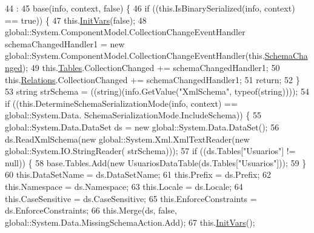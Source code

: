 \begin{DoxyCode}
44                                                                                                            
                                                : 
45                 base(info, context, \textcolor{keyword}{false}) \{
46             \textcolor{keywordflow}{if} ((this.IsBinarySerialized(info, context) == \textcolor{keyword}{true})) \{
47                 this.\hyperlink{class_proyecto___integrador__3_1_1ds_usuarios_ab120e453e46f20e82cdb1440541a8bfc}{InitVars}(\textcolor{keyword}{false});
48                 global::System.ComponentModel.CollectionChangeEventHandler schemaChangedHandler1 = \textcolor{keyword}{new} 
      global::System.ComponentModel.CollectionChangeEventHandler(this.\hyperlink{class_proyecto___integrador__3_1_1ds_usuarios_a48c9727d0752dcca6fa0cc10e6937861}{SchemaChanged});
49                 this.\hyperlink{class_proyecto___integrador__3_1_1ds_usuarios_a5a3e80b30906b3389a7282cdf5dd621c}{Tables}.CollectionChanged += schemaChangedHandler1;
50                 this.\hyperlink{class_proyecto___integrador__3_1_1ds_usuarios_ac1a722fbe5919c3d98ef3cc923978cec}{Relations}.CollectionChanged += schemaChangedHandler1;
51                 \textcolor{keywordflow}{return};
52             \}
53             \textcolor{keywordtype}{string} strSchema = ((string)(info.GetValue(\textcolor{stringliteral}{"XmlSchema"}, typeof(\textcolor{keywordtype}{string}))));
54             \textcolor{keywordflow}{if} ((this.DetermineSchemaSerializationMode(info, context) == global::System.Data.
      SchemaSerializationMode.IncludeSchema)) \{
55                 global::System.Data.DataSet ds = \textcolor{keyword}{new} global::System.Data.DataSet();
56                 ds.ReadXmlSchema(\textcolor{keyword}{new} global::System.Xml.XmlTextReader(\textcolor{keyword}{new} global::System.IO.StringReader(
      strSchema)));
57                 \textcolor{keywordflow}{if} ((ds.Tables[\textcolor{stringliteral}{"Usuarios"}] != null)) \{
58                     base.Tables.Add(\textcolor{keyword}{new} UsuariosDataTable(ds.Tables[\textcolor{stringliteral}{"Usuarios"}]));
59                 \}
60                 this.DataSetName = ds.DataSetName;
61                 this.Prefix = ds.Prefix;
62                 this.Namespace = ds.Namespace;
63                 this.Locale = ds.Locale;
64                 this.CaseSensitive = ds.CaseSensitive;
65                 this.EnforceConstraints = ds.EnforceConstraints;
66                 this.Merge(ds, \textcolor{keyword}{false}, global::System.Data.MissingSchemaAction.Add);
67                 this.\hyperlink{class_proyecto___integrador__3_1_1ds_usuarios_ab120e453e46f20e82cdb1440541a8bfc}{InitVars}();

\end{DoxyCode}
